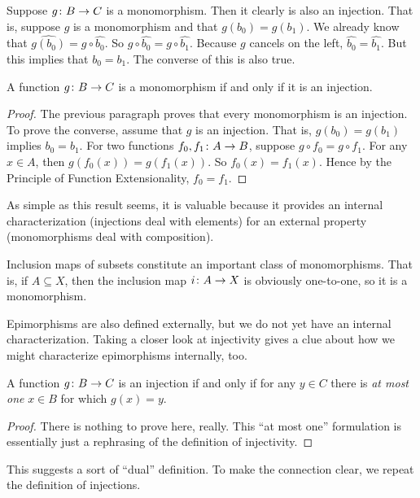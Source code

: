 Suppose ${g}\colon{B}\to{C}$ is a monomorphism. 
Then it clearly is also an injection. 
That is, suppose $g$ is a monomorphism and that $g(b_0)=g(b_1)$. 
We already know that $\widehat{g(b_0)} = g\circ \widehat{b_0}$.
So $g\circ \widehat{b_0} = g\circ \widehat{b_1}$.
Because $g$ cancels on the left, $\widehat{b_0} = \widehat{b_1}$.
But this implies that $b_0=b_1$.
The converse of this is also true.

\begin{lemma}
	A function ${g}\colon{B}\to{C}$ is a monomorphism if and only if it is an injection.
	\begin{proof}
		The previous paragraph proves that every monomorphism is an injection. To prove the converse, assume that $g$ is an injection. 
		That is, $g(b_0)=g(b_1)$ implies $b_0=b_1$.
		For two functions ${f_0,f_1}\colon{A}\to{B}$, suppose $g\circ f_0=g\circ f_1$. 
		For any $x\in A$, then $g(f_0(x)) = g(f_1(x))$. So $f_0(x)=f_1(x)$. Hence by the Principle of Function Extensionality, $f_0=f_1$.
	\end{proof}
\end{lemma}

As simple as this result seems, it is valuable because it provides an internal characterization (injections deal with elements) for an external property (monomorphisms deal with composition).

Inclusion maps of subsets constitute an important class of monomorphisms. That is,
if $A\subseteq X$, then the inclusion map ${i}\colon{A}\to{X}$ is obviously one-to-one, so it is a monomorphism.

Epimorphisms are also defined externally, but we do not yet have an internal characterization. 
Taking a closer look at injectivity gives a clue about how we might characterize epimorphisms internally, too.

\begin{lemma}
	A function ${g}\colon{B}\to{C}$ is an injection if and only if for any $y\in C$ there is \emph{at most one} $x\in B$ for which $g(x)=y$.
	
	\begin{proof}
There is nothing to prove here, really. This ``at most one'' formulation is essentially just a rephrasing of the definition of injectivity.
	\end{proof}
\end{lemma}

This suggests a sort of ``dual'' definition. To make the connection clear, we repeat the definition of injections.

